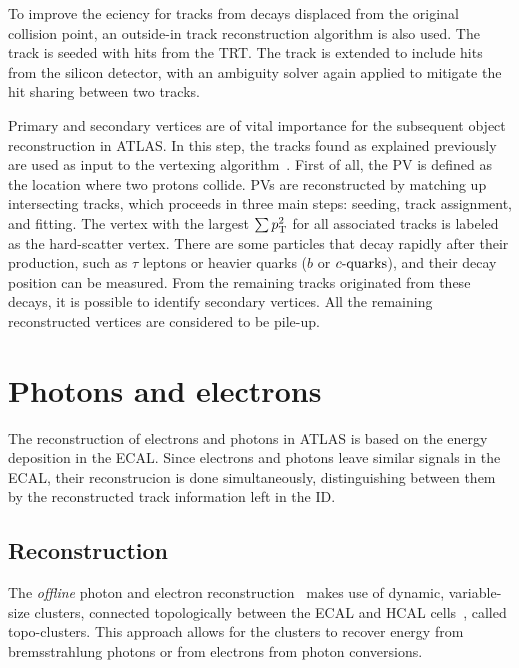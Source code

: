 To improve the eciency for tracks from decays displaced from the original collision point, an outside-in track reconstruction algorithm is also used. The track is seeded with hits from the \ac{TRT}. The track is extended to include hits from the silicon detector, with an ambiguity solver again applied to mitigate the hit sharing between two tracks.

Primary and secondary vertices are of vital importance for the subsequent object reconstruction in \ac{ATLAS}. In this step, the tracks found as explained previously are used as input to the vertexing algorithm~\cite{ATLASPVReconstruction,ATLASVertexReconstruction}. First of all, the \ac{PV} is defined as the location where two protons collide. \acp{PV} are reconstructed by matching up intersecting tracks, which proceeds in three main steps: seeding, track assignment, and fitting. The vertex with the largest \(\sum p_{\text{T}}^2\) for all associated tracks is labeled as the hard-scatter vertex. There are some particles that decay rapidly after their production, such as \(\tau\) leptons or heavier quarks (\(b\) or \(c\text{-quarks}\)), and their decay position can be measured. From the remaining tracks originated from these decays, it is possible to identify secondary vertices. All the remaining reconstructed vertices are considered to be pile-up.








\section{Photons and electrons}

The reconstruction of electrons and photons in \ac{ATLAS} is based on the energy deposition in the \ac{ECAL}. Since electrons and photons leave similar signals in the \ac{ECAL}, their reconstrucion is done simultaneously, distinguishing between them by the reconstructed track information left in the \ac{ID}.


\subsection{Reconstruction}

The \textit{offline} photon and electron reconstruction~\cite{ATLASEGammaPerformance20152017,ATLASTopoClustersRun2} makes use of dynamic, variable-size clusters, connected topologically between the \ac{ECAL} and \ac{HCAL} cells~\cite{ATLASTopoClustersRun1}, called topo-clusters. This approach allows for the clusters to recover energy from bremsstrahlung photons or from electrons from photon conversions.

